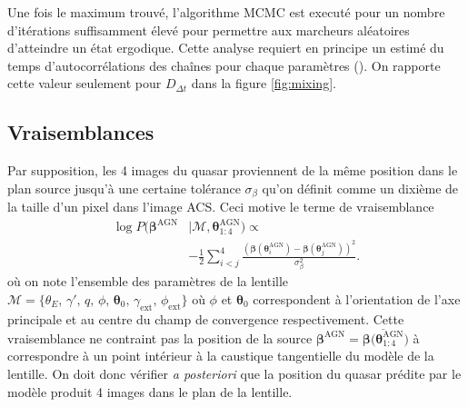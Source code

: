 \documentclass[times,10pt,twocolumn]{article}
\begin{document}
Une fois le maximum trouvé, l'algorithme MCMC est executé 
pour un nombre d'itérations suffisamment élevé pour permettre aux 
marcheurs aléatoires d'atteindre un état ergodique. Cette analyse requiert en principe 
un estimé du temps d'autocorrélations des chaînes pour chaque paramètres 
(\cite{Goodman2010}). On rapporte cette valeur seulement 
pour $D_{\Delta t}$ dans la 
figure \ref{fig:mixing}.

\subsection{Vraisemblances}
Par supposition, les 4 images du quasar proviennent de la même position 
dans le plan source jusqu'à une certaine tolérance $\sigma_\beta$ 
qu'on définit comme 
un dixième de la taille d'un pixel dans l'image ACS.
Ceci motive le terme de vraisemblance 
\begin{align}
        \nonumber
        \log P(\boldsymbol{\beta}^{\mathrm{AGN}} &\mid \mathcal{M}, 
        \boldsymbol{\theta}^{\mathrm{AGN}}_{1:4}
        )
        \propto  \\
\label{eq:SourceLike} 
        &-\frac{1}{2} \sum_{i < j}^{4} 
        \frac{\left( 
                        \boldsymbol{\beta}(\boldsymbol{\theta}_i^{\mathrm{AGN}}) - 
                        \boldsymbol{\beta}(\boldsymbol{\theta}_j^{\mathrm{AGN}})
        \right)^2}{\sigma^2_{\beta}}.
\end{align} 
où on note l'ensemble des paramètres de la lentille 
$\mathcal{M} = \{\theta_E,\, \gamma',\, q,\, \phi,\, \boldsymbol{\theta}_0,\, 
\gamma_{\mathrm{ext}},\, \phi_{\mathrm{ext}}\}$ où $\phi$ et 
$\boldsymbol{\theta}_0$ correspondent à l'orientation de l'axe principale et 
au centre du champ de convergence respectivement.
Cette vraisemblance ne contraint pas la position de la source 
$\boldsymbol{\beta}^{\mathrm{AGN}} = \overline{\boldsymbol{\beta}(
\boldsymbol{\theta}^{\mathrm{AGN}}_{1:4}})$ à 
correspondre à un point intérieur à 
la caustique tangentielle du modèle de la lentille. 
On doit donc vérifier \textit{a posteriori} 
que la position du quasar 
prédite par le modèle produit 
4 images dans le plan de la lentille.
\end{document}
